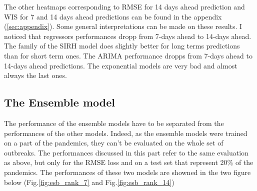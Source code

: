 The other heatmaps corresponding to RMSE for 14 days ahead prediction and WIS for 7 and 14 days ahead predictions can be found in the appendix (\ref{sec:appendix}).
Some general interpretations can be made on these results. 
I noticed that regressors performances dropp from 7-days ahead to 14-days ahead. 
The family of the SIRH model does slightly better for long terms predictions than for short term ones. 
The ARIMA performance dropps from 7-days ahead to 14-days ahead predictions. 
The exponential models are very bad and almost always the last ones. 

\subsection{The Ensemble model}
The performance of the ensemble models have to be separated from the performances of the other models. 
Indeed, as the ensemble models were trained on a part of the pandemics, they can't be evaluated on the whole set of outbreaks. 
The performances discussed in this part refer to the same evaluation as above, but only for the RMSE loss and on a test set that represent 20\% of the pandemics. 
The performances of these two models are showned in the two figure below (Fig.\ref{fig:esb_rank_7} and Fig.\ref{fig:esb_rank_14})

